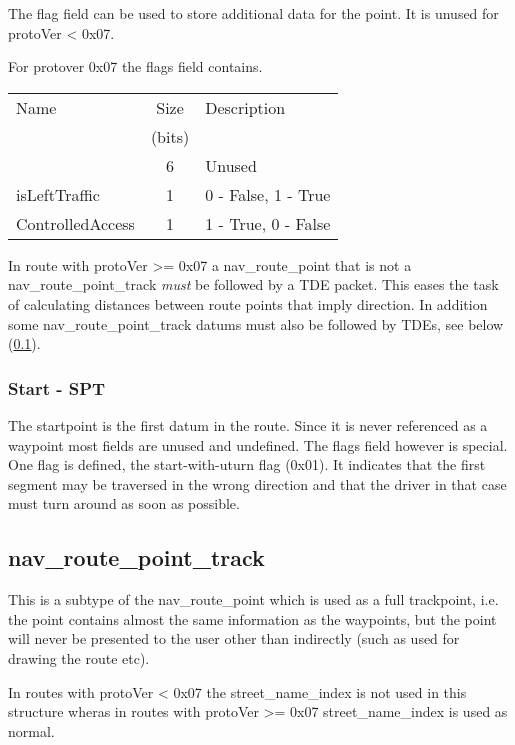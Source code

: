 \documentclass[a4paper]{article}
\begin{document}
The flag field can be used to store additional data for the point. It 
is unused for protoVer < 0x07.

For protover 0x07 the flags field contains.

\begin{centering}
\begin{tabular}{|l|c|l|}
\hline
Name  & Size     & Description \\
      & (bits)   &             \\\hline
      & 6        & Unused      \\\hline
isLeftTraffic     & 1        & 0 - False, 1 - True \\\hline
ControlledAccess  & 1        & 1 - True, 0 - False  \\\hline
\end{tabular}
\end{centering}

In route with protoVer >= 0x07 a nav\_route\_point that is not a 
nav\_route\_point\_track {\em must} 
be followed by a TDE packet. This eases the task of calculating distances
between route points that imply direction. In addition some 
nav\_route\_point\_track datums must also be followed by TDEs, see below
(\ref{navroutepointtrack}).

\subsubsection{Start - SPT}

The startpoint is the first datum in the route. Since it is never referenced 
as a waypoint most fields are unused and undefined. The flags field however 
is special. One flag is defined, the start-with-uturn flag (0x01). It
indicates that the first segment may be traversed in the wrong direction and
that the driver in that case must turn around as soon as possible.

\subsection{nav\_route\_point\_track}
\label{navroutepointtrack}

This is a subtype of the nav\_route\_point which is used as a full
trackpoint, i.e. the point contains almost the same information as
the waypoints, but the point will never be presented to the user
other than indirectly (such as used for drawing the route etc).

In routes with protoVer < 0x07 the street\_name\_index is not used 
in this structure wheras in routes with protoVer >= 0x07 
street\_name\_index is used as normal.
\end{document}
